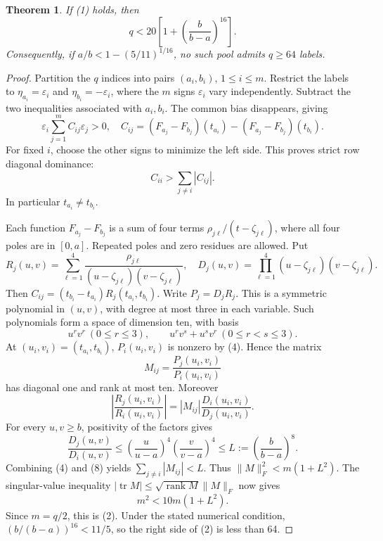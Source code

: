 \documentclass[11pt]{article}
\newtheorem{theorem}{Theorem}
\begin{document}
\begin{theorem}
If (1) holds, then
\[
 q<20\left[1+\left(\frac b{b-a}\right)^{16}\right].    \tag{2}
\]
Consequently, if $a/b<1-(5/11)^{1/16}$, no such pool admits
$q\geq64$ labels.
\end{theorem}
\begin{proof}
Partition the $q$ indices into pairs $(a_i,b_i)$, $1\leq i\leq m$.
Restrict the labels to $\eta_{a_i}=\varepsilon_i$ and
$\eta_{b_i}=-\varepsilon_i$, where the $m$ signs $\varepsilon_i$
vary independently. Subtract the two inequalities associated with
$a_i,b_i$. The common bias disappears, giving
\[
 \varepsilon_i\sum_{j=1}^m C_{ij}\varepsilon_j>0,
 \quad
 C_{ij}=(F_{a_j}-F_{b_j})(t_{a_i})
              -(F_{a_j}-F_{b_j})(t_{b_i}).           \tag{3}
\]
For fixed $i$, choose the other signs to minimize the left side.
This proves strict row diagonal dominance:
\[
 C_{ii}>\sum_{j\ne i}|C_{ij}|.                       \tag{4}
\]
In particular $t_{a_i}\ne t_{b_i}$.

Each function $F_{a_j}-F_{b_j}$ is a sum of four terms
$\rho_{j\ell}/(t-\zeta_{j\ell})$, where all four poles are in
$[0,a]$. Repeated poles and zero residues are allowed. Put
\[
 R_j(u,v)=\sum_{\ell=1}^4
       \frac{\rho_{j\ell}}{(u-\zeta_{j\ell})(v-\zeta_{j\ell})},
 \quad
 D_j(u,v)=\prod_{\ell=1}^4
           (u-\zeta_{j\ell})(v-\zeta_{j\ell}).        \tag{5}
\]
Then $C_{ij}=(t_{b_i}-t_{a_i})R_j(t_{a_i},t_{b_i})$.
Write $P_j=D_jR_j$. This is a symmetric polynomial in $(u,v)$,
with degree at most three in each variable. Such polynomials form a
space of dimension ten, with basis
\[
 u^r v^r\ (0\leq r\leq3),\qquad
 u^r v^s+u^s v^r\ (0\leq r<s\leq3).                 \tag{6}
\]
At $(u_i,v_i)=(t_{a_i},t_{b_i})$, $P_i(u_i,v_i)$ is nonzero by
(4). Hence the matrix
\[
 M_{ij}=\frac{P_j(u_i,v_i)}{P_i(u_i,v_i)}              \tag{7}
\]
has diagonal one and rank at most ten. Moreover
\[
 \left|\frac{R_j(u_i,v_i)}{R_i(u_i,v_i)}\right|
 =|M_{ij}|\frac{D_i(u_i,v_i)}{D_j(u_i,v_i)}.
\]
For every $u,v\geq b$, positivity of the factors gives
\[
 \frac{D_j(u,v)}{D_i(u,v)}
 \leq\left(\frac u{u-a}\right)^4
      \left(\frac v{v-a}\right)^4
 \leq L:=\left(\frac b{b-a}\right)^8.                \tag{8}
\]
Combining (4) and (8) yields $\sum_{j\ne i}|M_{ij}|<L$.
Thus $\|M\|_F^2<m(1+L^2)$. The singular-value inequality
$|\operatorname{tr}M|\leq\sqrt{\operatorname{rank}M}\|M\|_F$
now gives
\[
 m^2<10m(1+L^2).
\]
Since $m=q/2$, this is (2). Under the stated numerical condition,
$(b/(b-a))^{16}<11/5$, so the right side of (2) is less than 64.
\end{proof}
\end{document}
